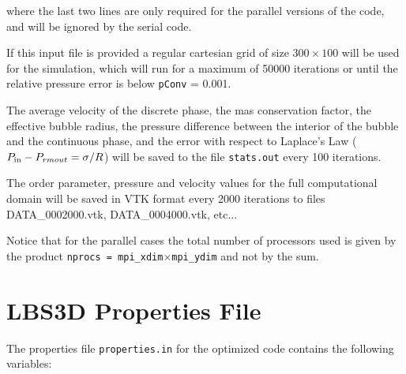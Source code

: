 \documentclass[12pt]{report}
\begin{document}

where the last two lines are only required for the parallel versions of the code, and will be ignored by the serial code.

If this input file is provided a regular cartesian grid of size $300\times100$ will be used for the simulation, which will run for a maximum of 50000 iterations or until the relative pressure error is below \verb+pConv+ = 0.001.

The average velocity of the discrete phase, the mas conservation factor, the effective bubble radius, the pressure difference between the interior of the bubble and the continuous phase, and the error with respect to Laplace's Law ($P_{\rm in} - P_{rm out} = \sigma/R$) will be saved to the file \verb+stats.out+ every 100 iterations.

The order parameter, pressure and velocity values for the full computational domain will be saved in VTK format every 2000 iterations to files DATA\_0002000.vtk, DATA\_0004000.vtk, etc...

Notice that for the parallel cases the total number of processors used is given by the product \texttt{nprocs = mpi\_xdim$\times$mpi\_ydim} and not by the sum.

\section{LBS3D Properties File}
The properties file \verb+properties.in+ for the optimized code contains the following variables:
\end{document}
